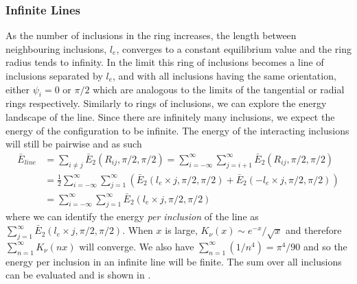 \subsubsection{Infinite Lines}
As the number of inclusions in the ring increases, the length between neighbouring inclusions, $l_e$, converges to a constant equilibrium value and the ring radius tends to infinity. In the limit this ring of inclusions becomes a line of inclusions separated by $l_e$, and with all inclusions having the same orientation, either $\psi_i=0$ or $\pi/2$ which are analogous to the limits of the tangential or radial rings respectively. Similarly to rings of inclusions, we can explore the energy landscape of the line. Since there are infinitely many inclusions, we expect the energy of the configuration to be infinite. The energy of the interacting inclusions will still be pairwise and as such
\begin{align}
    \bar{E}_{line} &= \sum_{i\neq j}\bar{E}_2(R_{ij}, \pi/2, \pi/2) = \sum_{i=-\infty}^{\infty}\sum_{j=i+1}^{\infty}\bar{E}_2(R_{ij}, \pi/2, \pi/2) \\
    &= \frac{1}{2}\sum_{i=-\infty}^{\infty}\sum_{j=1}^{\infty}\left(\bar{E}_2(l_e \times j, \pi/2, \pi/2) + \bar{E}_2(-l_e \times j, \pi/2, \pi/2)\right) \\
    &= \sum_{i=-\infty}^{\infty}\sum_{j=1}^{\infty}\bar{E}_2(l_e \times j, \pi/2, \pi/2) 
\end{align}
where we can identify the energy \textit{per inclusion} of the line as $\sum_{j=1}^{\infty}\bar{E}_2(l_e \times j, \pi/2, \pi/2)$. When $x$ is large, $K_\nu(x)\sim e^{-x}/\sqrt{x}$ and therefore $\sum_{n=1}^\infty K_\nu(nx)$ will converge. We also have $\sum_{n=1}^\infty(1/n^4) = \pi^4/90$ and so the energy per inclusion in an infinite line will be finite. The sum over all inclusions can be evaluated and is shown in .

